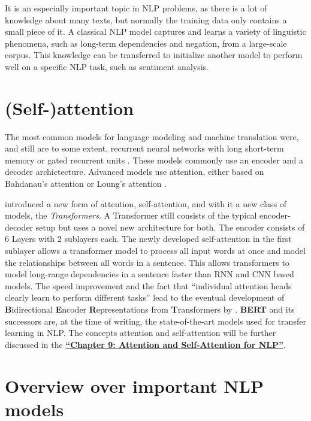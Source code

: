 \documentclass[]{krantz}
\begin{document}
It is an especially important topic in NLP problems, as there is a lot of knowledge about many texts, but normally the training data only contains a small piece of it. A classical NLP model captures and learns a variety of linguistic phenomena, such as long-term dependencies and negation, from a large-scale corpus. This knowledge can be transferred to initialize another model to perform well on a specific NLP task, such as sentiment analysis. \citep{evolutiontransferlearning}

\hypertarget{self-attention}{%
\section{(Self-)attention}\label{self-attention}}

The most common models for language modeling and machine translation were, and still are to some extent, recurrent neural networks with long short-term memory \citep{hochreiter1997long} or gated recurrent units \citep{gru}. These models commonly use an encoder and a decoder archictecture. Advanced models use attention, either based on Bahdanau's attention \citep{bahdanau2014neural} or Loung's attention \citep{luong2015effective}.

\citet{vaswani2017attention} introduced a new form of attention, self-attention, and with it a new class of models, the \textit{Transformers}. A Transformer still consists of the typical encoder-decoder setup but uses a novel new architecture for both. The encoder consists of 6 Layers with 2 sublayers each. The newly developed self-attention in the first sublayer allows a transformer model to process all input words at once and model the relationships between all words in a sentence. This allows transformers to model long-range dependencies in a sentence faster than RNN and CNN based models. The speed improvement and the fact that ``individual attention heads clearly learn to perform different tasks'' \citet{vaswani2017attention} lead to the eventual development of \textbf{B}idirectional \textbf{E}ncoder \textbf{R}epresentations from \textbf{T}ransformers by \citet{bert}. \textbf{BERT} and its successors are, at the time of writing, the state-of-the-art models used for transfer learning in NLP. The concepts attention and self-attention will be further discussed in the \protect\hyperlink{Attention-and-self-Attention-for-nlp}{\textbf{``Chapter 9: Attention and Self-Attention for NLP''}}.

\hypertarget{overview-over-important-nlp-models}{%
\section{Overview over important NLP models}\label{overview-over-important-nlp-models}}
\end{document}
